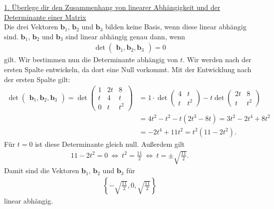 \underline{1. Überlege dir den Zusammenhang von linearer Abhängigkeit und der Determinante einer Matrix}\\
Die drei Vektoren $ \textbf{b}_1 $, $ \textbf{b}_2 $ und $ \textbf{b}_3$ bilden keine Basis, wenn diese linear abhängig sind. 
$ \textbf{b}_1 $, $ \textbf{b}_2 $ und $ \textbf{b}_3$ sind linear abhängig genau dann, wenn
\begin{align*}
\det \begin{pmatrix}
\textbf{b}_1,\textbf{b}_2,\textbf{b}_3
\end{pmatrix}
= 0
\end{align*}
gilt. 
Wir bestimmen nun die Determinante abhängig von $ t $. Wir werden nach der ersten Spalte entwickeln, da dort eine Null vorkommt. Mit der Entwicklung nach der ersten Spalte gilt:
\begin{align*}
\det \begin{pmatrix}
\textbf{b}_1,\textbf{b}_2,\textbf{b}_3
\end{pmatrix}
= 
\det 
\begin{pmatrix}
1 & 2t & 8\\
t & 4 &t \\
0 & t & t^2
\end{pmatrix}
&=
1 \cdot \det \begin{pmatrix}
4 & t \\
t & t^2
\end{pmatrix}
- t \det
\begin{pmatrix}
2t & 8 \\
t & t^2
\end{pmatrix}\\
&=
4t^2 - t^2 - t(2t^3 - 8t)
= 
3t^2 - 2t^4 + 8 t^2 \\
&= -2t^4 + 11 t^2
=
t^2(11 - 2 t^2).
\end{align*}
Für $ t = 0 $ ist diese Determinante gleich null.
Außerdem gilt
\begin{align*}
11 - 2t^2 = 0
\ \Leftrightarrow \
t^2 = \frac{ 11}{2}
\ \Leftrightarrow \
t = \pm \sqrt{\frac{11}{2}}.
\end{align*} 
Damit sind die Vektoren $ \textbf{b}_1 $, $ \textbf{b}_2 $ und $ \textbf{b}_3$ für 
\begin{align*}
\left\lbrace - \sqrt{\frac{11}{2}} , 0 ,  \sqrt{\frac{11}{2}} \right\rbrace
\end{align*}
linear abhängig.
\newpage
